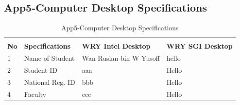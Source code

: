 \begin{landscape}
\subsection{App5-Computer Desktop Specifications}
	
	\begin{table}[ht]
		\begin{center}
			\caption{App5-Computer Desktop Specifications}		
			\label{table:App5-Computer Desktop Specifications}	
			
			\begin{tabular}{ |p{0.5cm}|p{5.0cm}|p{9.0cm}|p{9.0cm}|}
				\rowcolor{gray!10}			
				\hline \multicolumn{4}{|c|}{\textbf{Computer Desktop Specifications}} \\ [1.0ex]
				\rowcolor{gray!10}
				\hline \textbf{No} & \textbf{Specifications}  & \textbf{WRY Intel Desktop} & \textbf{WRY SGI Desktop}\\ 
				
				\hline 1 & Name of Student    & Wan Ruslan bin W Yusoff & hello\\ 
				\hline 2 & Student ID         &  aaa & Hello\\ 
				\hline 3 & National Reg. ID   & bbb  & Hello\\ 
				\hline 4 & Faculty            & ccc  & Hello\\ 
				
				\hline
			\end{tabular}
		\end{center}
	\end{table}  
	
	
\end{landscape}
\clearpage
